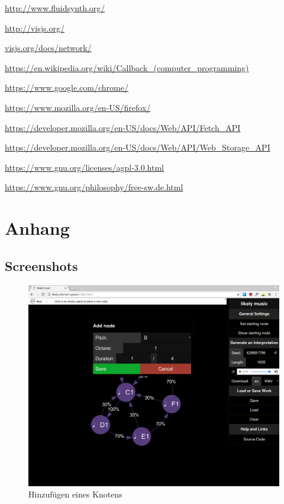 \documentclass[a4paper,twocolumn]{article}
\begin{document}
\begin{thebibliography}{9}
  \url{http://www.fluidsynth.org/}

  \url{http://visjs.org/}

  \url{visjs.org/docs/network/}

  \url{https://en.wikipedia.org/wiki/Callback_(computer_programming)}

  \url{https://www.google.com/chrome/}

  \url{https://www.mozilla.org/en-US/firefox/}

  \url{https://developer.mozilla.org/en-US/docs/Web/API/Fetch_API}

  \url{https://developer.mozilla.org/en-US/docs/Web/API/Web_Storage_API}

  \url{https://www.gnu.org/licenses/agpl-3.0.html}

  \url{https://www.gnu.org/philosophy/free-sw.de.html}
\end{thebibliography}

\clearpage
\onecolumn

\section*{Anhang}

\subsection*{Screenshots}
\begin{figure}[H]
  \begin{center}
  \includegraphics[width=.7\textwidth]{screenshots/add-node.png}
  \end{center}
  \caption{Hinzufügen eines Knotens}
\end{figure}
\end{document}
